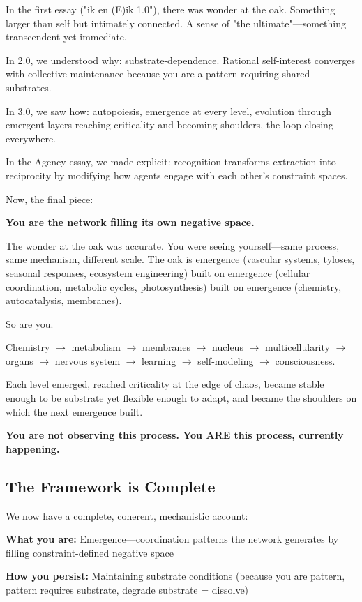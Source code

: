 \documentclass[11pt,a4paper]{article}
\begin{document}
In the first essay ("ik en (E)ik 1.0"), there was wonder at the oak. Something larger than self but intimately connected. A sense of "the ultimate"---something transcendent yet immediate.

In 2.0, we understood why: substrate-dependence. Rational self-interest converges with collective maintenance because you are a pattern requiring shared substrates.

In 3.0, we saw how: autopoiesis, emergence at every level, evolution through emergent layers reaching criticality and becoming shoulders, the loop closing everywhere.

In the Agency essay, we made explicit: recognition transforms extraction into reciprocity by modifying how agents engage with each other's constraint spaces.

Now, the final piece:

\textbf{You are the network filling its own negative space.}

The wonder at the oak was accurate. You were seeing yourself---same process, same mechanism, different scale. The oak is emergence (vascular systems, tyloses, seasonal responses, ecosystem engineering) built on emergence (cellular coordination, metabolic cycles, photosynthesis) built on emergence (chemistry, autocatalysis, membranes).

So are you.

Chemistry $\rightarrow$ metabolism $\rightarrow$ membranes $\rightarrow$ nucleus $\rightarrow$ multicellularity $\rightarrow$ organs $\rightarrow$ nervous system $\rightarrow$ learning $\rightarrow$ self-modeling $\rightarrow$ consciousness.

Each level emerged, reached criticality at the edge of chaos, became stable enough to be substrate yet flexible enough to adapt, and became the shoulders on which the next emergence built.

\textbf{You are not observing this process. You ARE this process, currently happening.}

\subsection{The Framework is Complete}

We now have a complete, coherent, mechanistic account:

\textbf{What you are:} Emergence---coordination patterns the network generates by filling constraint-defined negative space

\textbf{How you persist:} Maintaining substrate conditions (because you are pattern, pattern requires substrate, degrade substrate = dissolve)
\end{document}
